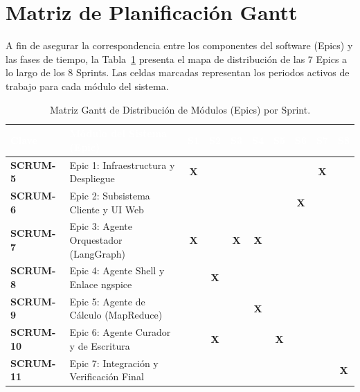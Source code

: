 \documentclass[12pt,letterpaper,oneside]{report}
\begin{document}
\section{Matriz de Planificación Gantt}
A fin de asegurar la correspondencia entre los componentes del software (Epics) y las fases de tiempo, la Tabla~\ref{tab:gantt_academico} presenta el mapa de distribución de las 7 Epics a lo largo de los 8 Sprints. Las celdas marcadas representan los periodos activos de trabajo para cada módulo del sistema.

\begin{table}[h!]
\centering
\small
\caption{Matriz Gantt de Distribución de Módulos (Epics) por Sprint.}
\label{tab:gantt_academico}
\vspace{0.3cm}
\setlength{\aboverulesep}{0pt}
\setlength{\belowrulesep}{0pt}
\renewcommand{\arraystretch}{1.8}

\begin{tabularx}{\textwidth}{l X cccccccc}
\toprule
\rowcolor{guinda}
\textcolor{white}{\textbf{Clave}} & \textcolor{white}{\textbf{Módulo del Sistema (Epic)}} & \textcolor{white}{\textbf{S1}} & \textcolor{white}{\textbf{S2}} & \textcolor{white}{\textbf{S3}} & \textcolor{white}{\textbf{S4}} & \textcolor{white}{\textbf{S5}} & \textcolor{white}{\textbf{S6}} & \textcolor{white}{\textbf{S7}} & \textcolor{white}{\textbf{S8}} \\
\midrule
\textbf{SCRUM-5} & Epic 1: Infraestructura y Despliegue & \cellcolor{esimegreen!25}\textbf{X} & & & & & & \cellcolor{esimegreen!25}\textbf{X} & \\
\textbf{SCRUM-6} & Epic 2: Subsistema Cliente y UI Web & & & & & & \cellcolor{esimegreen!25}\textbf{X} & & \\
\textbf{SCRUM-7} & Epic 3: Agente Orquestador (LangGraph) & \cellcolor{esimegreen!25}\textbf{X} & & \cellcolor{esimegreen!25}\textbf{X} & \cellcolor{esimegreen!25}\textbf{X} & & & & \\
\textbf{SCRUM-8} & Epic 4: Agente Shell y Enlace ngspice & & \cellcolor{esimegreen!25}\textbf{X} & & & & & & \\
\textbf{SCRUM-9} & Epic 5: Agente de Cálculo (MapReduce) & & & & \cellcolor{esimegreen!25}\textbf{X} & & & & \\
\textbf{SCRUM-10} & Epic 6: Agente Curador y de Escritura & & \cellcolor{esimegreen!25}\textbf{X} & & & \cellcolor{esimegreen!25}\textbf{X} & & & \\
\textbf{SCRUM-11} & Epic 7: Integración y Verificación Final & & & & & & & & \cellcolor{esimegreen!25}\textbf{X} \\
\bottomrule
\end{tabularx}
\end{table}
\end{document}
